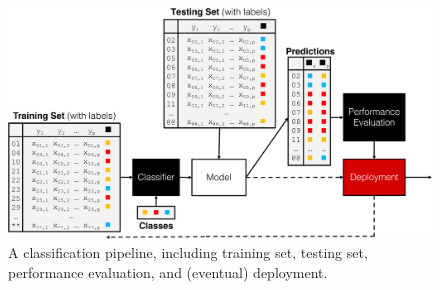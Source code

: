 \begin{figure}[!t]
\centering
\includegraphics[width=\textwidth]{images/DSML/Classifer_Pipeline.png}
\caption[\small Classification pipeline]{\small A classification pipeline, including training set, testing set, performance evaluation, and (eventual) deployment.}\label{fig:class1}
\end{figure}
\afterpage{\FloatBarrier}
